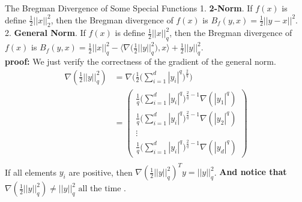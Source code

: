  	\begin{Examples}{The Bregman Divergence of Some Special Functions}{}
 		1. \textbf{2-Norm}. If $f(x)$ is define $\frac{1}{2}||x||^2_2$, then the Bregman divergence of $f(x)$ is $B_{f}(y,x) = \frac{1}{2}||y-x||^2$. \\
 		2. \textbf{General Norm}. If $f(x)$ is define $\frac{1}{2}||x||^2_q$, then the Bregman divergence of $f(x)$ is $B_{f}(y,x) = \frac{1}{2}||x||_q^2-\langle \nabla\bigg(\frac{1}{2}||y||_q^2 \bigg),x\rangle+ \frac{1}{2}||y||_q^2$. \\
 		\textbf{proof:} 
 		We just verify the correctness of the gradient of the general norm.
 		\begin{equation*}
 			\begin{split}
 				\nabla (\frac{1}{2}||y||_q^{2}) &= \nabla\Bigg( \frac{1}{2}\bigg(\sum_{i=1}^{d}|y_i|^q\bigg)^{\frac{2}{q}}\Bigg ) \\
 				&= \begin{pmatrix} \frac{1}{q} \bigg(\sum_{i=1}^{d}|y_i|^q\bigg)^{\frac{2}{q}-1} \nabla(|y_1|^q) \\ \frac{1}{q} \bigg(\sum_{i=1}^{d}|y_i|^q\bigg)^{\frac{2}{q}-1} \nabla(|y_2|^q) \\ \vdots \\ \frac{1}{q} \bigg(\sum_{i=1}^{d}|y_i|^q\bigg)^{\frac{2}{q}-1} \nabla(|y_d|^q)\end{pmatrix} \\
 			\end{split}
 		\end{equation*}
 		If all elements $y_i$ are positive, then $\nabla (\frac{1}{2}||y||_q^{2})^Ty=||y||_q^{2}$. \textbf{And notice that $\nabla (\frac{1}{2}||y||_q^{2}) \neq ||y||_q^2 \text{ all the time }$}.
 	\end{Examples}
\ifx\allfiles\undefined

\fi